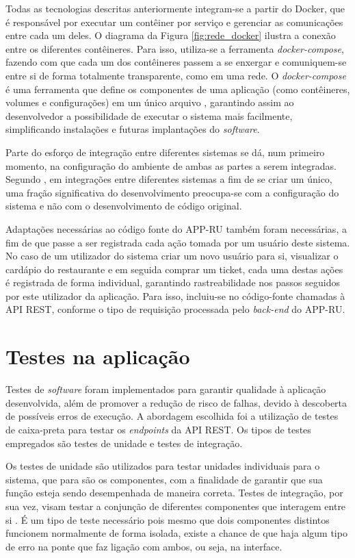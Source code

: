 Todas as tecnologias descritas anteriormente integram-se a partir do Docker, que é responsável por executar um contêiner por serviço e gerenciar as comunicações entre cada um deles. O diagrama da Figura \ref{fig:rede_docker} ilustra a conexão entre os diferentes contêineres. Para isso, utiliza-se a ferramenta \emph{docker-compose}, fazendo com que cada um dos contêineres passem a se enxergar e comuniquem-se entre si de forma totalmente transparente, como em uma rede. O \emph{docker-compose} é uma ferramenta que define os componentes de uma aplicação (como contêineres, volumes e configurações) em um único arquivo \cite{Raj2015-ju}, garantindo assim ao desenvolvedor a possibilidade de executar o sistema mais facilmente, simplificando instalações e futuras implantações do \emph{software}.

Parte do esforço de integração entre diferentes sistemas se dá, num primeiro momento, na configuração do ambiente de ambas as partes a serem integradas. Segundo \cite{Sommerville2011}, em integrações entre diferentes sistemas a fim de se criar um único, uma fração significativa do desenvolvimento preocupa-se com a configuração do sistema e não com o desenvolvimento de código original. 

Adaptações necessárias ao código fonte do APP-RU também foram necessárias, a fim de que passe a ser registrada cada ação tomada por um usuário deste sistema. No caso de um utilizador do sistema criar um novo usuário para si, visualizar o cardápio do restaurante e em seguida comprar um ticket, cada uma destas ações é registrada de forma individual, garantindo rastreabilidade nos passos seguidos por este utilizador da aplicação. Para isso, incluiu-se no código-fonte chamadas à API REST, conforme o tipo de requisição processada pelo \emph{back-end} do APP-RU.


\section{Testes na aplicação}
Testes de \emph{software} foram implementados para garantir qualidade à aplicação desenvolvida, além de promover a redução de risco de falhas, devido à descoberta de possíveis erros de execução. A abordagem escolhida foi a utilização de testes de caixa-preta para testar os \emph{endpoints} da API REST. Os tipos de testes empregados são testes de unidade e testes de integração.

Os testes de unidade são utilizados para testar unidades individuais para o sistema, que para \cite{Pressman2021-jj} são os componentes, com a finalidade de garantir que sua função esteja sendo desempenhada de maneira correta. Testes de integração, por sua vez, visam testar a conjunção de diferentes componentes que interagem entre si \cite{Pressman2021-jj}. É um tipo de teste necessário pois mesmo que dois componentes distintos funcionem normalmente de forma isolada, existe a chance de que haja algum tipo de erro na ponte que faz ligação com ambos, ou seja, na interface.

